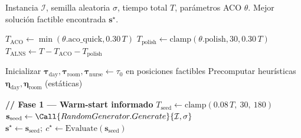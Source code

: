 %

\begin{algorithm}[H]
\caption{\textsc{HybridSolver} — Algoritmo final del proyecto (\texttt{preset=hybrid}).}
\label{alg:hybrid-solver}
\begin{algorithmic}[1]
\Require Instancia $\mathcal{I}$, semilla aleatoria $\sigma$, tiempo total $T$, parámetros ACO $\theta$.
\Ensure Mejor solución factible encontrada $\mathbf{s}^{\star}$.

\State $T_{\text{ACO}} \gets \min(\theta.\text{aco\_quick}, 0.30\,T)$
\State $T_{\text{polish}} \gets \mathrm{clamp}(\theta.\text{polish}, 30, 0.30\,T)$
\State $T_{\text{ALNS}} \gets T - T_{\text{ACO}} - T_{\text{polish}}$

\State Inicializar $\boldsymbol{\tau}_{\text{day}}, \boldsymbol{\tau}_{\text{room}}, \boldsymbol{\tau}_{\text{nurse}} \gets \tau_0$ en posiciones factibles
\State Precomputar heurísticas $\boldsymbol{\eta}_{\text{day}}, \boldsymbol{\eta}_{\text{room}}$ (estáticas)

\Statex \textbf{// Fase 1 — Warm-start informado}
\State $T_{\text{seed}} \gets \mathrm{clamp}(0.08\,T,\ 30,\ 180)$
\State $\mathbf{s}_{\text{seed}} \gets \Call{RandomGenerator.Generate}{\mathcal{I}, \sigma}$
\State {}
   \State $\mathbf{s}^{\star} \gets \mathbf{s}_{\text{seed}};\ c^{\star} \gets \text{Evaluate}(\mathbf{s}_{\text{seed}})$
   \State {}
\EndIf


\end{algorithmic}
\end{algorithm}
